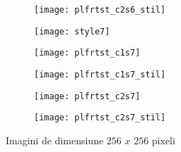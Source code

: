 \begin{figure}[h]
\begin{subfigure}[b]{0.19\textwidth}
	\end{subfigure}
    \hfill
    \begin{subfigure}[b]{0.19\textwidth}
		\centering
        \texttt{[image: plfrtst\_c2s6\_stil]}
        \label{fig:plfrtst_c2s6_stil}
	\end{subfigure}
    \begin{subfigure}[b]{0.19\textwidth}
		\centering
        \texttt{[image: style7]}
        \label{fig:anaoas_style7}
	\end{subfigure}
    \hfill
    \begin{subfigure}[b]{0.19\textwidth}
		\centering
        \texttt{[image: plfrtst\_c1s7]}
        \label{fig:plfrtst_c1s7}
	\end{subfigure}
    \hfill
    \begin{subfigure}[b]{0.19\textwidth}
		\centering
        \texttt{[image: plfrtst\_c1s7\_stil]}
        \label{fig:plfrtst_c1s7_stil}
	\end{subfigure}
    \hfill
    \begin{subfigure}[b]{0.19\textwidth}
		\centering
        \texttt{[image: plfrtst\_c2s7]}
        \label{fig:plfrtst_c2s7}
	\end{subfigure}
    \hfill
    \begin{subfigure}[b]{0.19\textwidth}
		\centering
        \texttt{[image: plfrtst\_c2s7\_stil]}
        \label{fig:plfrtst_c2s7_stil}
	\end{subfigure}
    \caption{Imagini de dimensiune $256$ $x$ $256$ pixeli}
\end{figure}

